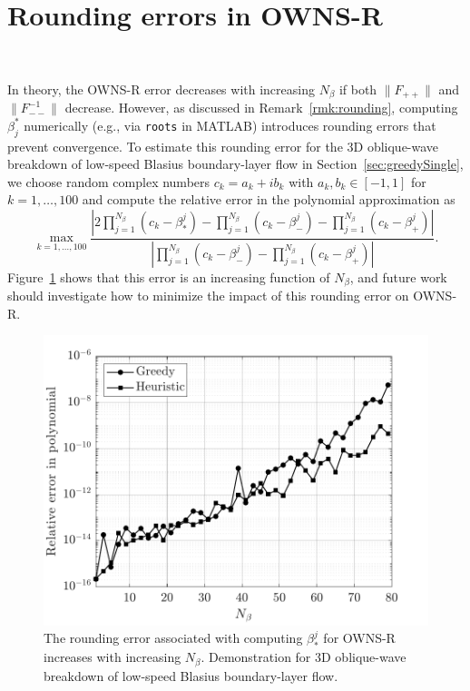 \section{Rounding errors in OWNS-R}~\label{app:Rounding}

In theory, the OWNS-R error decreases with increasing $N_\beta$ if both $\|F_{++}\|$ and $\|F_{--}^{-1}\|$ decrease. However, as discussed in Remark~\ref{rmk:rounding}, computing $\beta_j^*$ numerically (e.g., via \texttt{roots} in MATLAB) introduces rounding errors that prevent convergence. To estimate this rounding error for the 3D oblique-wave breakdown of low-speed Blasius boundary-layer flow in Section~\ref{sec:greedySingle}, we choose random complex numbers $c_k = a_k+ib_k$ with $a_k,b_k\in[-1,1]$ for $k=1,\dots,100$ and compute the relative error in the polynomial approximation as
\begin{equation}
    \max_{k=1,\dots,100}
    \frac{
    |2\prod_{j=1}^{N_\beta}(c_k-\beta_*^j)
    -\prod_{j=1}^{N_\beta}(c_k-\beta_-^j)
    -\prod_{j=1}^{N_\beta}(c_k-\beta_+^j)|}
    {|\prod_{j=1}^{N_\beta}(c_k-\beta_-^j)
    -\prod_{j=1}^{N_\beta}(c_k-\beta_+^j)|}.
\end{equation}
Figure~\ref{fig:poly_err} shows that this error is an increasing function of $N_\beta$, and future work should investigate how to minimize the impact of this rounding error on OWNS-R.
\begin{figure}
    \centering
    \includegraphics[width=0.5\linewidth]{figures/Oblique_Poly_Err_bw.pdf}
    \caption{The rounding error associated with computing $\beta_*^j$ for OWNS-R increases with increasing $N_\beta$. Demonstration for 3D oblique-wave breakdown of low-speed Blasius boundary-layer flow.}
    \label{fig:poly_err}
\end{figure}